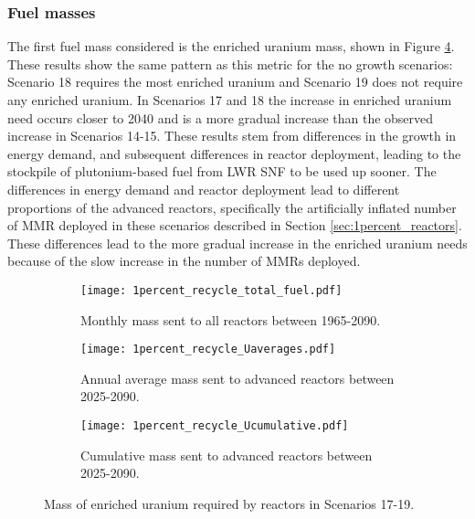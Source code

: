 \subsubsection{Fuel masses}
The first fuel mass considered is the enriched uranium mass, 
shown in Figure \ref{fig:1percent_recycle_uranium}. These results 
show the same pattern as this metric for the no growth scenarios:
Scenario 18 requires the most enriched uranium and Scenario 19 
does not require any enriched uranium. In Scenarios 17 and 18 the 
increase in enriched uranium need occurs closer to 2040 and is a 
more gradual increase than the observed increase in Scenarios 14-15. 
These results stem from differences in the growth in energy 
demand, and subsequent differences in reactor deployment, leading to the stockpile 
of plutonium-based fuel from \gls{LWR} \gls{SNF} to be used up sooner. 
The differences in energy demand and reactor deployment lead to different 
proportions of the advanced reactors, specifically the artificially
inflated number of \gls{MMR} deployed in these scenarios described 
in Section \ref{sec:1percent_reactors}. These differences 
lead to the more gradual increase in the enriched uranium needs
because of the slow increase in the number of \glspl{MMR} deployed.

\begin{figure}[h!]
    \centering
    \begin{subfigure}[b]{0.45\textwidth}
        \centering
        \texttt{[image: 1percent\_recycle\_total\_fuel.pdf]}
        \caption{Monthly mass sent to all reactors 
        between 1965-2090.}
        \label{fig:1percent_recycle_all_uranium}
    \end{subfigure}
    \hfill
    \begin{subfigure}[b]{0.45\textwidth}
        \centering
        \texttt{[image: 1percent\_recycle\_Uaverages.pdf]}
        \caption{Annual average mass sent to 
        advanced reactors between 2025-2090.}
        \label{fig:1percent_recycle_AR_uranium}
    \end{subfigure}
    \begin{subfigure}[b]{0.45\textwidth}
        \centering
        \texttt{[image: 1percent\_recycle\_Ucumulative.pdf]}
        \caption{Cumulative mass sent to advanced reactors between 2025-2090.}
        \label{fig:1percent_recycle_uranium_cumulative}
    \end{subfigure}
       \caption{Mass of enriched uranium required by reactors
        in Scenarios 17-19.}
       \label{fig:1percent_recycle_uranium}
\end{figure}

